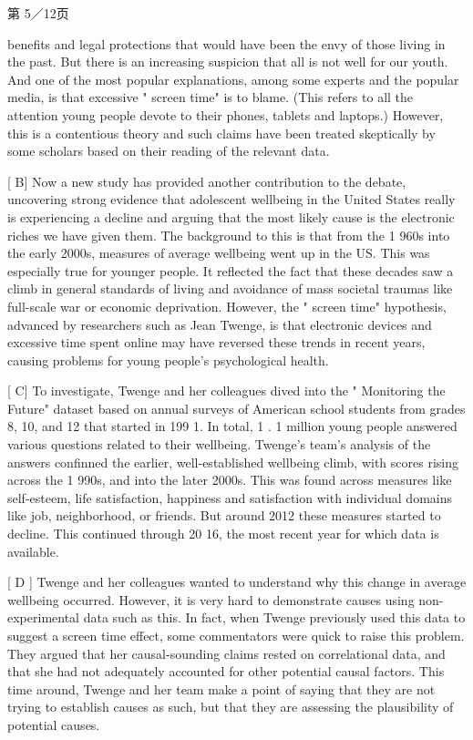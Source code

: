 \documentclass[UTF8,11pt]{ctexart}
\begin{document}
第 5／12页


benefits and legal protections that would have been the envy of those living in the past. But there is an increasing suspicion that all is not well for our youth. And one of the most popular explanations, among some experts and the popular media, is that excessive " screen time" is to blame. (This refers to all the attention young people devote to their phones, tablets and laptops.) However, this is a contentious theory and such claims have been treated skeptically by some scholars based on their reading of the relevant data.


[ B] Now a new study has provided another contribution to the debate, uncovering strong evidence that adolescent wellbeing in the United States really is experiencing a decline and arguing that the most likely cause is the electronic riches we have given them. The background to this is that from the 1 960s into the early 2000s, measures of average wellbeing went up in the US. This was especially true for younger people. It reflected the fact that these decades saw a climb in general standards of living and avoidance of mass societal traumas like full-scale war or economic deprivation. However, the " screen time" hypothesis, advanced by researchers such as Jean Twenge, is that electronic devices and excessive time spent online may have reversed these trends in recent years, causing problems for young people's psychological health.


[ C] To investigate, Twenge and her colleagues dived into the " Monitoring the Future" dataset based on annual surveys of American school students from grades 8, 10, and 12 that started in 199 1. In total, 1 . 1 million young people answered various questions related to their wellbeing. Twenge's team's analysis of the answers confinned the earlier, well-established wellbeing climb, with scores rising across the 1 990s, and into the later 2000s. This was found across measures like self-esteem, life satisfaction, happiness and satisfaction with individual domains like job, neighborhood, or friends. But around 2012 these measures started to decline. This continued through 20 16, the most recent year for which data is available.


[ D ] Twenge and her colleagues wanted to understand why this change in average wellbeing occurred. However, it is very hard to demonstrate causes using non-experimental data such as this. In fact, when Twenge previously used this data to suggest a screen time effect, some commentators were quick to raise this problem. They argued that her causal-sounding claims rested on correlational data, and that she had not adequately accounted for other potential causal factors. This time around, Twenge and her team make a point of saying that they are not trying to establish causes as such, but that they are assessing the plausibility of potential causes.
\end{document}
